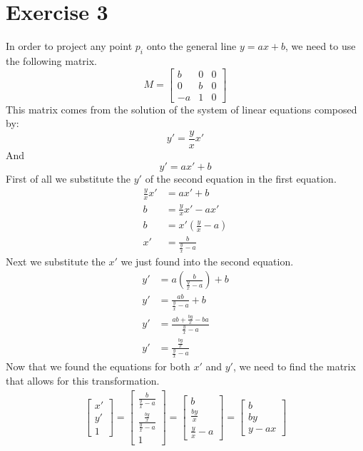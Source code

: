 \documentclass{article}
\begin{document}
\section{Exercise 3}
In order to project any point $p_i$ onto the general line $y = ax + b$, we need to use the following matrix.
\[ M = \begin{bmatrix} b & 0 & 0 \\ 0 & b & 0 \\ -a & 1 & 0 \end{bmatrix} \]
This matrix comes from the solution of the system of linear equations composed by:
\[ y' = \frac{y}{x} x' \]
And
\[ y' = ax'+b \]
First of all we substitute the $y'$ of the second equation in the first equation.
\begin{align*}
	\frac{y}{x} x' & = ax' + b \\
	b & = \frac{y}{x} x' - ax' \\
	b & = x' \left( \frac{y}{x} - a \right) \\
	x' & = \frac{b}{\frac{y}{x} - a}
\end{align*}
Next we substitute the $x'$ we just found into the second equation.
\begin{align*}
	y' & = a \left( \frac{b}{\frac{y}{x}-a} \right) + b \\
	y' & = \frac{ab}{\frac{y}{x}-a} + b \\
	y' & = \frac{ab + \frac{by}{x} -ba}{\frac{y}{x}-a} \\
	y' & = \frac{ \frac{by}{x}}{\frac{y}{x}-a}
\end{align*}
Now that we found the equations for both $x'$ and $y'$, we need to find the matrix that allows for this transformation.
\begin{align*}
	\begin{bmatrix} x' \\ y' \\ 1 \end{bmatrix} = \begin{bmatrix} \frac{b}{\frac{y}{x} - a} \\  \frac{ \frac{by}{x}}{\frac{y}{x}-a} \\ 1 \end{bmatrix} = \begin{bmatrix} b \\  \frac{by}{x} \\ \frac{y}{x}-a \end{bmatrix} = \begin{bmatrix} b \\  by \\ y-ax \end{bmatrix}
\end{align*}
\end{document}
